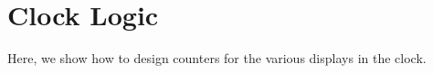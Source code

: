 \documentclass[conference]{IEEEtran}
\begin{document}
\section{Clock Logic}
Here, we show how to design counters for the various displays in the clock.










\end{document}
